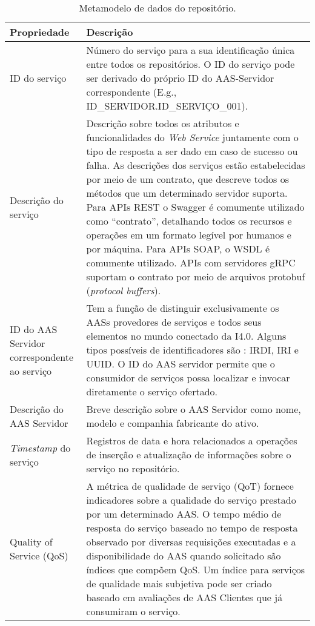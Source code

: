 	\begin{table}[htb]
		\centering
		\label{tab:mdp-repositorio}
		\begin{tabular}{p{3cm}p{12cm}}
			\hline
			\textbf{Propriedade}
			& \textbf{Descrição} \\ 
			
			\hline
			ID do serviço
			& Número do serviço para a sua identificação única entre todos os repositórios. O ID do serviço pode ser derivado do próprio ID do AAS-Servidor correspondente (E.g., ID\_SERVIDOR.ID\_SERVIÇO\_001). \\
			
			\hline
			Descrição do serviço
			& Descrição sobre todos os atributos e funcionalidades do \textit{Web Service} juntamente com o tipo de resposta a ser dado em caso de sucesso ou falha. As descrições dos serviços estão estabelecidas por meio de um contrato, que descreve todos os métodos que um determinado servidor suporta. Para APIs REST o Swagger é comumente utilizado como ``contrato'', detalhando todos os recursos e operações em um formato legível por humanos e por máquina. Para APIs SOAP, o WSDL é comumente utilizado. APIs com servidores gRPC suportam o contrato por meio de arquivos protobuf (\textit{protocol buffers}). \\
			
			\hline
			ID do AAS Servidor correspondente ao serviço
			& Tem a função de distinguir exclusivamente os AASs provedores de serviços e todos seus elementos \cite{adolphs2016structure} no mundo conectado da I4.0. Alguns tipos possíveis de identificadores são \cite{bader2019aas}: IRDI, IRI e UUID. O ID do AAS servidor permite que o consumidor de serviços possa localizar e invocar diretamente o serviço ofertado. \\
			
			\hline
			Descrição do AAS Servidor
			& Breve descrição sobre o AAS Servidor como nome, modelo e companhia fabricante do ativo. \\	
			
			\hline
			\textit{Timestamp} do serviço
			& Registros de data e hora relacionados a operações de inserção e atualização de informações sobre o serviço no repositório. \\
			
			\hline
			Quality of Service (QoS)
			& A métrica de qualidade de serviço (QoT) fornece indicadores sobre a qualidade do serviço prestado por um determinado AAS. O tempo médio de resposta do serviço baseado no tempo de resposta observado por diversas requisições executadas e a disponibilidade do AAS quando solicitado são índices que compõem QoS. Um índice para serviços de qualidade mais subjetiva pode ser criado baseado em avaliações de AAS Clientes que já consumiram o serviço.\\
			
			\hline
		\end{tabular}
		\caption{Metamodelo de dados do repositório.}
	\end{table}
	
